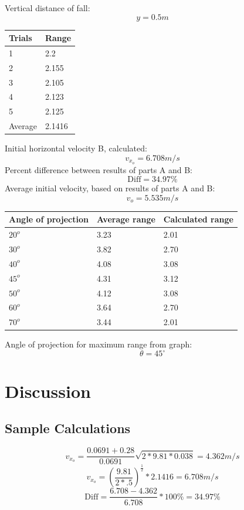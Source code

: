 \documentclass[11pt, titlepage]{article}
\begin{document}
\pagebreak
\noindent Vertical distance of fall:
$$y = 0.5 m$$
\begin{center}
\begin{tabular}
{|m{7em}|m{7em}|}
\hline
Trials & Range\\
\hline
1 & 2.2\\
\hline
2 & 2.155\\
\hline
3 & 2.105\\
\hline
4 & 2.123\\
\hline
5 & 2.125\\
\hline
Average & 2.1416\\
\hline
\end{tabular}
\end{center}
Initial horizontal velocity B, calculated:
$$v_{x_o} = 6.708 m/s$$
Percent difference between results of parts A and B:
$$\text{Diff} = 34.97\%$$
Average initial velocity, based on results of parts A and B:
$$v_o = 5.535 m/s$$
\begin{center}
\begin{tabular}
{|m{7em}|m{7em}|m{7em}|}
\hline
Angle of projection & Average range & Calculated range\\
\hline
$20^o$ & 3.23 & 2.01\\
\hline
$30^o$ & 3.82 & 2.70\\
\hline
$40^o$ & 4.08 & 3.08\\
\hline
$45^o$ & 4.31 & 3.12\\
\hline
$50^o$ & 4.12 & 3.08\\
\hline
$60^o$ & 3.64 & 2.70\\
\hline
$70^o$ & 3.44 & 2.01\\
\hline
\end{tabular}
\end{center}
Angle of projection for maximum range from graph:
$$ \theta = 45^\circ$$
\pagebreak
\section*{Discussion}
\subsection*{Sample Calculations}
$$v_{x_o} = \frac{0.0691+0.28}{0.0691}\sqrt{2\ast9.81\ast0.038} = 4.362 m/s$$
$$v_{x_o} = (\frac{9.81}{2\ast.5})^\frac{1}{2}\ast2.1416 = 6.708 m/s$$
$$\text{Diff} = \frac{6.708-4.362}{6.708}\ast100\% = 34.97\%$$
\end{document}
